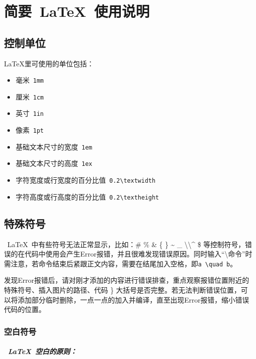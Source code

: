 \chapter{简要~\LaTeX~使用说明}\label{cha:latex-brief-intro}

\section{控制单位}

LaTeX里可使用的单位包括：
\begin{itemize}
    \item 毫米\ \verb|1mm|
    \item 厘米\ \verb|1cm|
    \item 英寸\ \verb|1in|
    \item 像素\ \verb|1pt|
    \item 基础文本尺寸的宽度\ \verb|1em|
    \item 基础文本尺寸的高度\ \verb|1ex|
    \item 字符宽度或行宽度的百分比值\ \verb|0.2\textwidth|
    \item 字符高度或行高度的百分比值\ \verb|0.2\textheight|
\end{itemize}

\section{特殊符号}

~\LaTeX~中有些符号无法正常显示，比如：\# \quad \% \quad \& \quad \{ \quad \} \quad \~{} \quad \_{} \quad \textbackslash \quad \backslash \quad \^{} \quad \$ 等控制符号，错误的在代码中使用会产生Error报错，并且很难发现错误原因。同时输入“\backslash 命令”时需注意，若命令结束后紧跟正文内容，需要在结尾加入空格，即\verb|a \quad b|。

发现Error报错后，请对刚才添加的内容进行错误排查，重点观察报错位置附近的特殊符号、插入图片的路径、代码 \} 大括号是否完整。若无法判断错误位置，可以将添加部分临时删除，一点一点的加入并编译，直至出现Error报错，缩小错误代码的位置。

\subsection{空白符号}

\paragraph*{~\LaTeX~空白的原则：}

